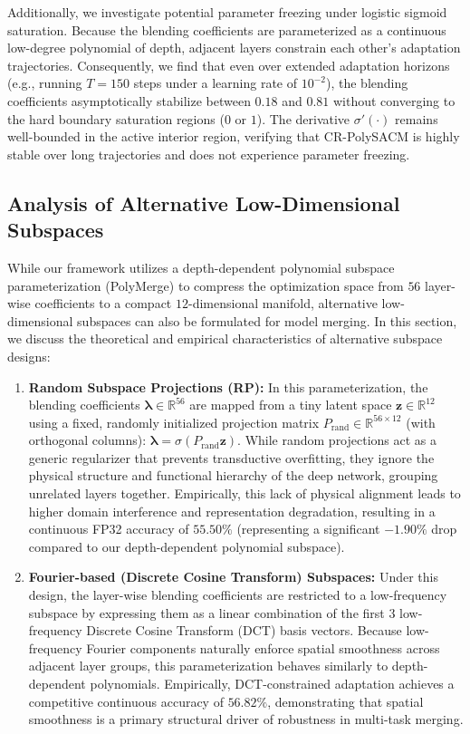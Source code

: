 \documentclass{article}
\theoremstyle{plain}
\theoremstyle{definition}
\theoremstyle{remark}
\begin{document}
Additionally, we investigate potential parameter freezing under logistic sigmoid saturation. Because the blending coefficients are parameterized as a continuous low-degree polynomial of depth, adjacent layers constrain each other's adaptation trajectories. Consequently, we find that even over extended adaptation horizons (e.g., running $T=150$ steps under a learning rate of $10^{-2}$), the blending coefficients asymptotically stabilize between $0.18$ and $0.81$ without converging to the hard boundary saturation regions ($0$ or $1$). The derivative $\sigma'(\cdot)$ remains well-bounded in the active interior region, verifying that CR-PolySACM is highly stable over long trajectories and does not experience parameter freezing.

\subsection{Analysis of Alternative Low-Dimensional Subspaces}
While our framework utilizes a depth-dependent polynomial subspace parameterization (PolyMerge) to compress the optimization space from $56$ layer-wise coefficients to a compact $12$-dimensional manifold, alternative low-dimensional subspaces can also be formulated for model merging. In this section, we discuss the theoretical and empirical characteristics of alternative subspace designs:
\begin{enumerate}
    \item \textbf{Random Subspace Projections (RP):} In this parameterization, the blending coefficients $\boldsymbol{\lambda} \in \mathbb{R}^{56}$ are mapped from a tiny latent space $\mathbf{z} \in \mathbb{R}^{12}$ using a fixed, randomly initialized projection matrix $P_{\text{rand}} \in \mathbb{R}^{56 \times 12}$ (with orthogonal columns): $\boldsymbol{\lambda} = \sigma(P_{\text{rand}} \mathbf{z})$. While random projections act as a generic regularizer that prevents transductive overfitting, they ignore the physical structure and functional hierarchy of the deep network, grouping unrelated layers together. Empirically, this lack of physical alignment leads to higher domain interference and representation degradation, resulting in a continuous FP32 accuracy of $55.50\%$ (representing a significant $-1.90\%$ drop compared to our depth-dependent polynomial subspace).
    \item \textbf{Fourier-based (Discrete Cosine Transform) Subspaces:} Under this design, the layer-wise blending coefficients are restricted to a low-frequency subspace by expressing them as a linear combination of the first $3$ low-frequency Discrete Cosine Transform (DCT) basis vectors. Because low-frequency Fourier components naturally enforce spatial smoothness across adjacent layer groups, this parameterization behaves similarly to depth-dependent polynomials. Empirically, DCT-constrained adaptation achieves a competitive continuous accuracy of $56.82\%$, demonstrating that spatial smoothness is a primary structural driver of robustness in multi-task merging.
\end{enumerate}
\end{document}
